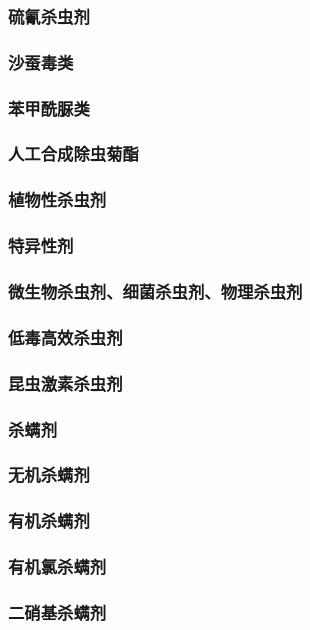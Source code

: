 \documentclass[UTF8]{../../ApplicationUniverse}
\begin{document}
        \subsubsection{硫氰杀虫剂}
        \subsubsection{沙蚕毒类}
            \subsubsection{苯甲酰脲类}
            \subsubsection{人工合成除虫菊酯}
    \subsubsection{植物性杀虫剂}
    \subsubsection{特异性剂}
    \subsubsection{微生物杀虫剂、细菌杀虫剂、物理杀虫剂}
    \subsubsection{低毒高效杀虫剂}
    \subsubsection{昆虫激素杀虫剂}
\subsubsection{杀螨剂}
    \subsubsection{无机杀螨剂}
    \subsubsection{有机杀螨剂}
        \subsubsection{有机氯杀螨剂}
        \subsubsection{二硝基杀螨剂}
\end{document}
